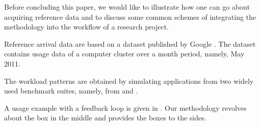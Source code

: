 
Before concluding this paper, we would like to illustrate how one can go about
acquiring reference data and to discuss some common schemes of integrating the
methodology into the workflow of a research project.

Reference arrival data are based on a dataset published by Google \cite{google}.
The dataset contains usage data of a computer cluster over a month period,
namely, May 2011.

The workload patterns are obtained by simulating applications from two widely
used benchmark suites, namely, from  \cite{bienia2011} and  \cite{cpu2006}.

A usage example with a feedback loop is given in . Our methodology
revolves about the box in the middle and provides the boxes to the sides.
